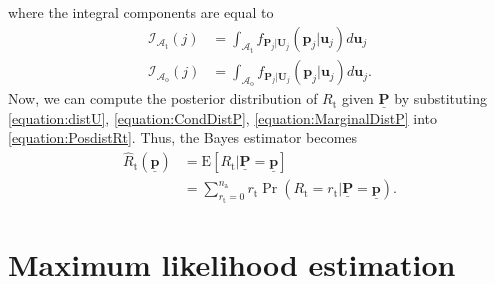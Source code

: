 where the integral components are equal to
\begin{align} \label{equation:IntegralComponentsT}
\mathcal{I}_{\mathcal{A}_{\mathrm{t}}}(j)
&= \int_{\mathcal{A}_{\mathrm{t}}} f_{\mathbf{P}_j|\mathbf{U}_j}
(\mathbf{p}_j|\mathbf{u}_j) d\mathbf{u}_j \\
\label{equation:IntegralComponentsO}
\mathcal{I}_{\mathcal{A}_{\mathrm{o}}}(j)
&= \int_{\mathcal{A}_{\mathrm{o}}} f_{\mathbf{P}_j|\mathbf{U}_j}
(\mathbf{p}_j|\mathbf{u}_j) d\mathbf{u}_j .
\end{align}
Now, we can compute the posterior distribution of $R_{\mathrm{t}}$ given $\underline{\mathbf{P}}$ by substituting \eqref{equation:distU}, \eqref{equation:CondDistP}, \eqref{equation:MarginalDistP} into \eqref{equation:PosdistRt}.
\newline
Thus, the Bayes estimator becomes
\begin{equation} \label{equation:MMSE}
\begin{split}
\hat{R}_{\mathrm{t}} \left( \underline{\mathbf{p}} \right)
&= \mathrm{E} \left[ R_{\mathrm{t}}
| \underline{\mathbf{P}} = \underline{\mathbf{p}} \right] \\
&= \sum_{r_{\mathrm{t}} = 0}^{n_{\mathrm{a}}} r_{\mathrm{t}}
\Pr \left( R_{\mathrm{t}} = r_{\mathrm{t}}
| \underline{\mathbf{P}} = \underline{\mathbf{p}} \right) .
\end{split}
\end{equation}


\section{Maximum likelihood estimation}

